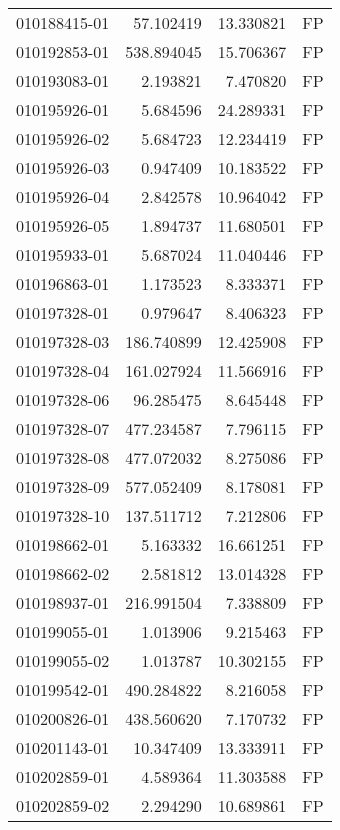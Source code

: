 \begin{tabular}{lrrl}
010188415-01 &   57.102419 &      13.330821 &   FP \\
010192853-01 &  538.894045 &      15.706367 &   FP \\
010193083-01 &    2.193821 &       7.470820 &   FP \\
010195926-01 &    5.684596 &      24.289331 &   FP \\
010195926-02 &    5.684723 &      12.234419 &   FP \\
010195926-03 &    0.947409 &      10.183522 &   FP \\
010195926-04 &    2.842578 &      10.964042 &   FP \\
010195926-05 &    1.894737 &      11.680501 &   FP \\
010195933-01 &    5.687024 &      11.040446 &   FP \\
010196863-01 &    1.173523 &       8.333371 &   FP \\
010197328-01 &    0.979647 &       8.406323 &   FP \\
010197328-03 &  186.740899 &      12.425908 &   FP \\
010197328-04 &  161.027924 &      11.566916 &   FP \\
010197328-06 &   96.285475 &       8.645448 &   FP \\
010197328-07 &  477.234587 &       7.796115 &   FP \\
010197328-08 &  477.072032 &       8.275086 &   FP \\
010197328-09 &  577.052409 &       8.178081 &   FP \\
010197328-10 &  137.511712 &       7.212806 &   FP \\
010198662-01 &    5.163332 &      16.661251 &   FP \\
010198662-02 &    2.581812 &      13.014328 &   FP \\
010198937-01 &  216.991504 &       7.338809 &   FP \\
010199055-01 &    1.013906 &       9.215463 &   FP \\
010199055-02 &    1.013787 &      10.302155 &   FP \\
010199542-01 &  490.284822 &       8.216058 &   FP \\
010200826-01 &  438.560620 &       7.170732 &   FP \\
010201143-01 &   10.347409 &      13.333911 &   FP \\
010202859-01 &    4.589364 &      11.303588 &   FP \\
010202859-02 &    2.294290 &      10.689861 &   FP \\

\end{tabular}
